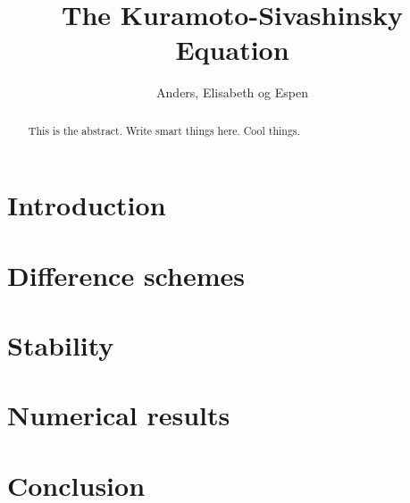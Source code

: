 \documentclass[10pt,a4paper]{article}
\begin{document}
\title{The Kuramoto-Sivashinsky Equation}
\author{Anders, Elisabeth og Espen}
\maketitle

\begin{abstract}
This is the abstract. Write smart things here. Cool things.
\end{abstract}

\section{Introduction}


\section{Difference schemes}


\section{Stability}


\section{Numerical results}


\section{Conclusion}

\end{document}
